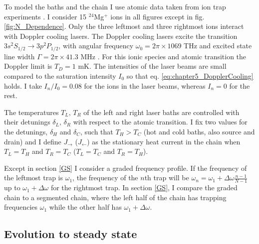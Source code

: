To model the baths and the chain I use atomic data taken from ion trap experiments \cite{Leupold2015,Lo2015}. I consider 15 $^{24}$Mg$^+$ ions in all figures except in fig. \ref{fig:N_Dependence}. Only the three leftmost and three rightmost ions interact with Doppler cooling lasers. The Doppler cooling lasers excite the transition $3s^2S_{1/2}\rightarrow 3p^2P_{1/2}$, with angular frequency $\omega_0 = 2 \pi \times 1069$ THz and excited state line width $\Gamma = 2\pi \times 41.3$ MHz \cite{Ruiz2014}. For this ionic species and atomic transition the Doppler limit is $T_D = 1$ mK.
The intensities of the laser beams are small compared to the saturation intensity $I_0$ so that eq. \eqref{eq:chapter5_DopplerCooling} holds. I take $I_n/I_0 = 0.08$ for the ions  in the laser beams, whereas  $I_n=0$ for the rest.

The temperatures $T_L,\,T_R$ of the left and right laser baths are controlled with their detunings $\delta_L,\,\delta_R$ with respect to the atomic transition. I fix two values for the detunings, $\delta_H$ and $\delta_C$, such that $T_H>T_C$ (hot and cold baths, also source and drain) and I define $J_\rightarrow$ ($J_\leftarrow$) as the stationary heat current in the chain when $T_L = T_H$ and $T_R = T_C$ ($T_L = T_C$ and $T_R = T_H$).

Except in section \ref{GS} I consider a graded frequency profile.
If the frequency of the leftmost trap is $\omega_1$, the frequency of the $n$th trap will be $\omega_n = \omega_1 +\Delta\omega\frac{n-1}{N-1}$ up to $\omega_1 +\Delta\omega$ for the rightmost trap. In
section \ref{GS}, I compare the graded chain to a segmented chain, where the left half of the chain has trapping frequencies $\omega_1$ while the other half has $\omega_1 +\Delta\omega$.


\subsection{Evolution to steady state \label{Results_A}}

